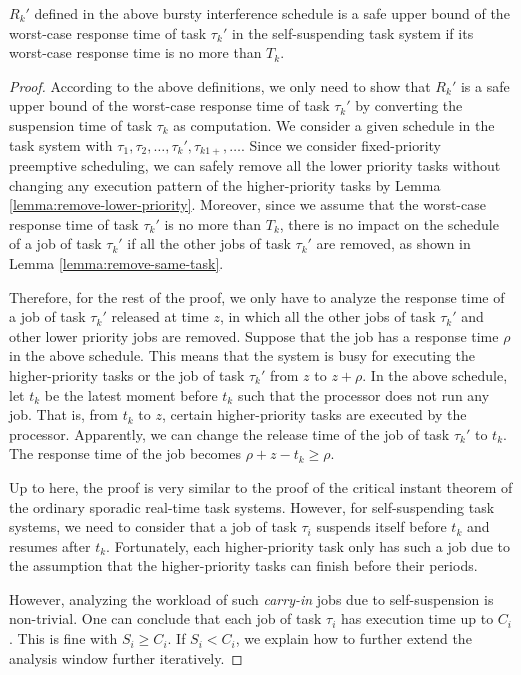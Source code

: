 \begin{lemma}
\label{lemma:critical}
 $R_k'$ defined in the above bursty interference schedule is a safe upper bound of the worst-case response time of task $\tau_k'$ in the self-suspending task system if its worst-case response time is no more than $T_k$.
\end{lemma}
\begin{proof}
According to the above definitions, we only need to show that $R_k'$ is a safe upper bound of the worst-case response time of task $\tau_k'$ by converting the suspension time of task $\tau_k$ as computation. We consider a given schedule in the task system with $\tau_1, \tau_2, \ldots, \tau_k', \tau_{k1+}, \ldots$. Since we consider fixed-priority preemptive scheduling, we can safely remove all the lower priority tasks without changing any execution pattern of the higher-priority tasks by Lemma \ref{lemma:remove-lower-priority}. Moreover, since we assume that the worst-case response time of task $\tau_k'$ is no more than $T_k$, there is no impact on the schedule of a job of task $\tau_k'$ if all the other jobs of task $\tau_k'$ are removed, as shown in Lemma \ref{lemma:remove-same-task}. 


Therefore, for the rest of the proof, we only have to analyze the response time of a job of task $\tau_k'$ released at time $z$, in which all the other jobs of task $\tau_k'$ and other lower priority jobs are removed. Suppose that the job has a response time $\rho$ in the above schedule. This means that the system is busy for executing the higher-priority tasks or the job of task $\tau_k'$ from $z$ to $z+\rho$. In the above schedule, let $t_{k}$ be the latest moment before $t_k$ such that the processor does not run any job. That is, from $t_k$ to $z$, certain higher-priority tasks are executed by the processor. Apparently, we can change the release time of the job of task $\tau_k'$ to $t_k$. The response time of the job becomes $\rho+z-t_k \geq \rho$. 

Up to here, the proof is very similar to the proof of the critical instant theorem of the ordinary sporadic real-time task systems. However, for self-suspending task systems, we need to consider that a job of task $\tau_i$ suspends itself before $t_k$ and resumes after $t_k$.  Fortunately, each higher-priority task only has such a job due to the assumption that the higher-priority tasks can finish before their periods. 

However, analyzing the workload of such \emph{carry-in} jobs due to self-suspension is non-trivial. One can conclude that each job of task $\tau_i$ has execution time up to $C_i$. This is fine with $S_i \geq C_i$. If $S_i < C_i$, we explain how to further extend the analysis window further iteratively. 



\end{proof}
